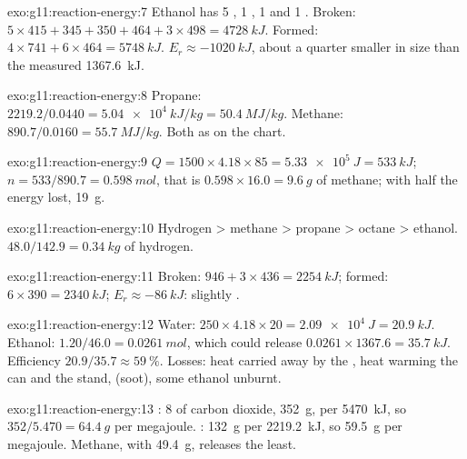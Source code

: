 \begin{solution}{exo:g11:reaction-energy:7}
Ethanol  has 5 , 1 , 1  and 1
. Broken: $5 \times 415 + 345 + 350 + 464 + 3 \times 498 =
\qty{4728}{kJ}$. Formed: $4 \times 741 + 6 \times 464 = \qty{5748}{kJ}$.
$E_r \approx \qty{-1020}{kJ}$, about a quarter smaller in size than the
measured \qty{1367.6}{kJ}.
\end{solution}

\begin{solution}{exo:g11:reaction-energy:8}
Propane: $2219.2 / 0.0440 = \qty{5.04e4}{kJ/kg} = \qty{50.4}{MJ/kg}$.
Methane: $890.7 / 0.0160 = \qty{55.7}{MJ/kg}$. Both as on the chart.
\end{solution}

\begin{solution}{exo:g11:reaction-energy:9}
$Q = 1500 \times 4.18 \times 85 = \qty{5.33e5}{J} = \qty{533}{kJ}$;
$n = 533 / 890.7 = \qty{0.598}{mol}$, that is $0.598 \times 16.0 =
\qty{9.6}{g}$ of methane; with half the energy lost, \qty{19}{g}.
\end{solution}

\begin{solution}{exo:g11:reaction-energy:10}
Hydrogen > methane > propane > octane > ethanol.
$48.0 / 142.9 = \qty{0.34}{kg}$ of hydrogen.
\end{solution}

\begin{solution}{exo:g11:reaction-energy:11}
Broken: $946 + 3 \times 436 = \qty{2254}{kJ}$; formed:
$6 \times 390 = \qty{2340}{kJ}$; $E_r \approx \qty{-86}{kJ}$: slightly
.
\end{solution}

\begin{solution}{exo:g11:reaction-energy:12}
Water: $250 \times 4.18 \times 20 = \qty{2.09e4}{J} = \qty{20.9}{kJ}$.
Ethanol: $1.20 / 46.0 = \qty{0.0261}{mol}$, which could release
$0.0261 \times 1367.6 = \qty{35.7}{kJ}$. Efficiency
$20.9 / 35.7 \approx \qty{59}{\percent}$. Losses: heat carried away by
the , heat warming the can and the stand,  (soot),
some ethanol  unburnt.
\end{solution}

\begin{solution}{exo:g11:reaction-energy:13}
: 8  of carbon dioxide,
\qty{352}{g}, per \qty{5470}{kJ}, so $352 / 5.470 = \qty{64.4}{g}$ per
megajoule. : \qty{132}{g} per
\qty{2219.2}{kJ}, so \qty{59.5}{g} per megajoule. Methane, with
\qty{49.4}{g}, releases the least.
\end{solution}

